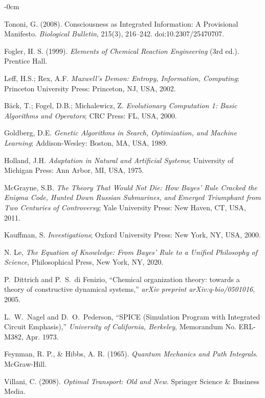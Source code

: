 \documentclass[entropy,article,submit,pdftex,moreauthors]{Definitions/mdpi}
\begin{document}
\begin{adjustwidth}{-\extralength}{0cm}
\begin{thebibliography}{999}
Tononi, G. (2008). Consciousness as Integrated Information: A Provisional Manifesto. \textit{Biological Bulletin}, 215(3), 216–242. doi:10.2307/25470707.

Fogler, H. S. (1999). \textit{Elements of Chemical Reaction Engineering} (3rd ed.). Prentice Hall.

Leff, H.S.; Rex, A.F. \textit{Maxwell’s Demon: Entropy, Information, Computing}; Princeton University Press: Princeton, NJ, USA, 2002.

Bäck, T.; Fogel, D.B.; Michalewicz, Z. \textit{Evolutionary Computation 1: Basic Algorithms and Operators}; CRC Press: FL, USA, 2000.

Goldberg, D.E. \textit{Genetic Algorithms in Search, Optimization, and Machine Learning}; Addison-Wesley: Boston, MA, USA, 1989.

Holland, J.H. \textit{Adaptation in Natural and Artificial Systems}; University of Michigan Press: Ann Arbor, MI, USA, 1975.

McGrayne, S.B. \textit{The Theory That Would Not Die: How Bayes' Rule Cracked the Enigma Code, Hunted Down Russian Submarines, and Emerged Triumphant from Two Centuries of Controversy}; Yale University Press: New Haven, CT, USA, 2011.

Kauffman, S. \textit{Investigations}; Oxford University Press: New York, NY, USA, 2000.

 N. Le, \textit{The Equation of Knowledge: From Bayes’ Rule to a Unified Philosophy of Science}, Philosophical Press, New York, NY, 2020.

P.~Dittrich and P.~S.~di Fenizio, ``Chemical organization theory: towards a theory of constructive dynamical systems,'' \emph{arXiv preprint arXiv:q-bio/0501016}, 2005.


L.~W.~Nagel and D.~O.~Pederson, ``SPICE (Simulation Program with Integrated Circuit Emphasis),'' 
{\em University of California, Berkeley}, Memorandum No. ERL-M382, Apr. 1973.

Feynman, R. P., \& Hibbs, A. R. (1965). \textit{Quantum Mechanics and Path Integrals}. McGraw-Hill.

Villani, C. (2008). \textit{Optimal Transport: Old and New}. Springer Science \& Business Media.



\end{thebibliography}
\end{adjustwidth}
\end{document}
